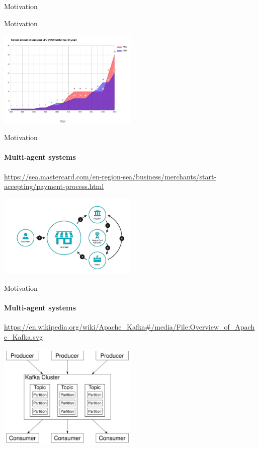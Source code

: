 \begin{section}{Motivation}
\begin{frame}[fragile]{Motivation}
\begin{center}
\includegraphics[width=0.5\textwidth]{./pics/core_per_cpu.png}
\end{center}

\end{frame}


\begin{frame}{Motivation}
\framesubtitle{Multi-agent systems}

{\tiny\url{https://sea.mastercard.com/en-region-sea/business/merchants/start-accepting/payment-process.html}}

\begin{center}
\includegraphics[width=0.5\textwidth]{./pics/mastercard.png}
\end{center}

\end{frame}


\begin{frame}{Motivation}
\framesubtitle{Multi-agent systems}

{\tiny\url{https://en.wikipedia.org/wiki/Apache_Kafka#/media/File:Overview_of_Apache_Kafka.svg}}

\begin{center}
\includegraphics[width=0.5\textwidth]{./pics/kafka.png}
\end{center}


\end{frame}
\end{section}
